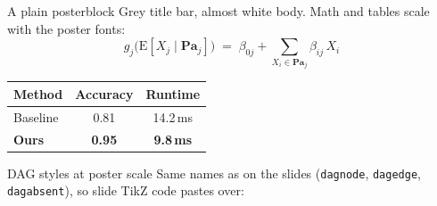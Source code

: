 \documentclass[10pt]{article}
\begin{document}
\begin{posterbody}
\vspace{12mm}


\begin{minipage}[t]{0.31\linewidth}\vspace{0pt}
  \begin{posterblock}{A plain posterblock}
    Grey title bar, almost white body. Math and tables scale with the
    poster fonts:
    \[
      g_j\bigl(\mathrm{E}[X_j \mid \mathbf{Pa}_j]\bigr)
      \;=\; \beta_{0j} + \sum_{X_i \in \mathbf{Pa}_j} \beta_{ij}\, X_i
    \]
    \begin{center}
      \small
      \begin{tabular}{lcc}
        \toprule
        Method & Accuracy & Runtime \\
        \midrule
        Baseline      & 0.81 & 14.2\,ms \\
        \textbf{Ours} & \textbf{0.95} & \textbf{9.8\,ms} \\
        \bottomrule
      \end{tabular}
    \end{center}
  \end{posterblock}
\end{minipage}\hfill
\begin{minipage}[t]{0.31\linewidth}\vspace{0pt}
  \begin{posterblock}{DAG styles at poster scale}
    Same names as on the slides (\texttt{dagnode}, \texttt{dagedge},
    \texttt{dagabsent}), so slide TikZ code pastes over:
    \begin{center}
    \end{center}

\end{posterblock}
\end{minipage}
\end{posterbody}
\end{document}
